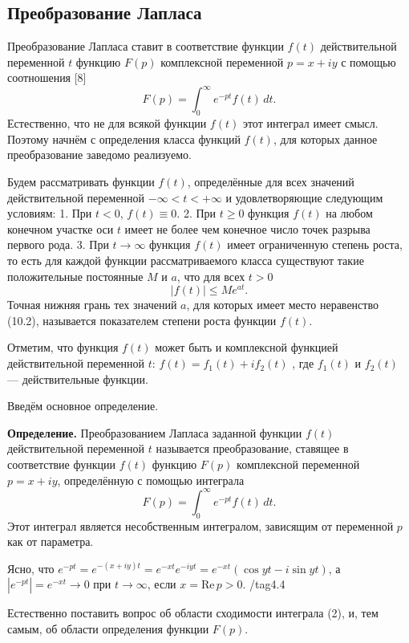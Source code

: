 \subsection{Преобразование Лапласа}{
 

Преобразование Лапласа ставит в соответствие функции \( f(t) \) действительной переменной \( t \) функцию \( F(p) \) комплексной переменной \( p = x + iy \) с помощью соотношения [8]
\[
F(p) = \int_0^{\infty} e^{-pt} f(t) \, dt. \tag{4.1}
\]
Естественно, что не для всякой функции \( f(t) \) этот интеграл имеет смысл. Поэтому начнём с определения класса функций \( f(t) \), для которых данное преобразование заведомо реализуемо.

Будем рассматривать функции \( f(t) \), определённые для всех значений действительной переменной \( -\infty < t < +\infty \) и удовлетворяющие следующим условиям:
1. При \( t < 0 \), \( f(t) \equiv 0 \).
2. При \( t \geq 0 \) функция \( f(t) \) на любом конечном участке оси \( t \) имеет не более чем конечное число точек разрыва первого рода.
3. При \( t \to \infty \) функция \( f(t) \) имеет ограниченную степень роста, то есть для каждой функции рассматриваемого класса существуют такие положительные постоянные \( M \) и \( a \), что для всех \( t > 0 \)
\[
|f(t)| \leq M e^{at}. \tag{4.2}
\]
Точная нижняя грань тех значений \( a \), для которых имеет место неравенство (10.2), называется показателем степени роста функции \( f(t) \).

Отметим, что функция \( f(t) \) может быть и комплексной функцией действительной переменной \( t \): \( f(t) = f_1(t) + i f_2(t) \) \tag, где \( f_1(t) \) и \( f_2(t) \) — действительные функции.

Введём основное определение.

\textbf{Определение.} Преобразованием Лапласа заданной функции \( f(t) \) действительной переменной \( t \) называется преобразование, ставящее в соответствие функции \( f(t) \) функцию \( F(p) \) комплексной переменной \( p = x + iy \), определённую с помощью интеграла
\[
F(p) = \int_0^{\infty} e^{-pt} f(t) \, dt. \tag{4.3}
\]
Этот интеграл является несобственным интегралом, зависящим от переменной \( p \) как от параметра.

Ясно, что \( e^{-pt} = e^{-(x+iy)t} = e^{-xt} e^{-iyt} = e^{-xt} (\cos yt - i \sin yt) \), а \( |e^{-pt}| = e^{-xt} \to 0 \) при \( t \to \infty \), если \( x = \text{Re} \, p > 0 \). /tag{4.4}

Естественно поставить вопрос об области сходимости интеграла (2), и, тем самым, об области определения функции \( F(p) \).

}

